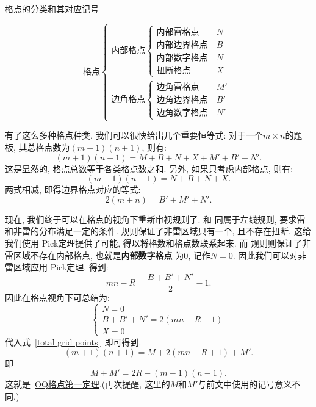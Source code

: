 \documentclass{ctexart}
\newcommand{\varible}[1]{{\Noto[#1]}}
\begin{document}
\begin{table}
    \caption{格点的分类和其对应记号}
    \label{gridpoint types}
    $$
    \text{格点}
    \begin{cases}
        \text{内部格点}
        \begin{cases}
            \text{内部雷格点}\ &N\\
            \text{内部边界格点}\ &B\\
            \text{内部数字格点}\ &N\\
            \text{扭断格点}\ &X
        \end{cases}\\
        \text{边角格点}
        \begin{cases}
            \text{边角雷格点}\ &M'\\
            \text{边角边界格点}\ &B'\\
            \text{边角数字格点}\ &N'
        \end{cases}
    \end{cases}
    $$
\end{table}

有了这么多种格点种类, 我们可以很快给出几个重要恒等式: 对于一个$m\times n$的题板, 其总格点数为$(m+1)(n+1)$, 则有:
\begin{equation}
    \label{total grid points}
    (m+1)(n+1) = M + B + N + X +M' + B' + N'.
\end{equation}
这是显然的, 格点总数等于各类格点数之和.
另外, 如果只考虑内部格点, 则有:
\begin{equation}
    \label{internal grid points}
    (m-1)(n-1) = N + B + N + X.
\end{equation}
两式相减, 即得边界格点对应的等式:
\begin{equation}
    \label{boundary grid points}
    2(m+n) = B' + M' + N'.
\end{equation}

现在, 我们终于可以在格点的视角下重新审视\varible{O}\varible{Q}规则了. \varible{O} 和\varible{Q} 同属于左线规则, 要求雷和非雷的分布满足一定的条件. 规则\varible{O}保证了非雷区域只有一个, 且不存在扭断, 这给我们使用 Pick定理提供了可能, 得以将格数和格点数联系起来. 而\varible{Q} 规则则保证了非雷区域不存在内部格点, 也就是\textbf{内部数字格点} 为0, 记作$N = 0$. 因此我们可以对非雷区域应用 Pick定理, 得到:
\begin{equation}
    \label{pick in OQ}
    mn - R = \frac{B + B' + N'}{2} - 1.
\end{equation}
因此\varible{O}\varible{Q}在格点视角下可总结为:
$$
\begin{cases}
    N = 0\\
    B + B' + N' = 2(mn - R + 1)\\
    X = 0
\end{cases}
$$
代入式\ \ref{total grid points}\ 即可得到.
$$
(m+1)(n+1) = M + 2(mn - R + 1) + M'.
$$
即
$$
M + M' = 2R - (m-1)(n-1).
$$
这就是\ \hyperref[OQ1]{OQ格点第一定理}.(再次提醒, 这里的$M$和$M'$与前文中使用的记号意义不同.)
\end{document}
